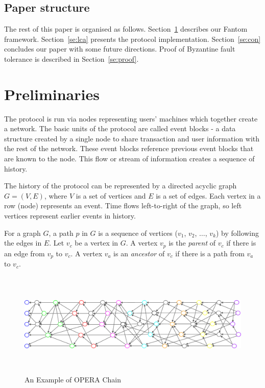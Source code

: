 \documentclass{article}
\begin{document}
\subsection{Paper structure}

The rest of this paper is organised as follows.
Section~\ref{se:prelim} describes our Fantom framework.
Section~\ref{se:lca} presents the protocol implementation.
Section~\ref{se:con} concludes our paper with some future directions.
Proof of Byzantine fault tolerance is described in Section~\ref{se:proof}.


\section{Preliminaries}\label{se:prelim}

The protocol is run via nodes representing users' machines which together create a network. The basic units of the protocol are called event blocks - a data structure created by a single node to share transaction and user information with the rest of the network. These event blocks reference previous event blocks that are known to the node. This flow or stream of information creates a sequence of history.

The history of the protocol can be represented by a directed acyclic graph $G=(V, E)$, where $V$ is a set of vertices and $E$ is a set of edges. Each vertex in a row (node) represents an event. Time flows left-to-right of the graph, so left vertices represent earlier events in history. 

For a graph $G$, a path $p$ in $G$ is a sequence  of vertices ($v_1$, $v_2$, $\dots$, $v_k$) by following the edges in $E$.
Let $v_c$ be a vertex in $G$.
A vertex $v_p$ is the \emph{parent} of $v_c$ if there is an edge from $v_p$ to $v_c$.
A vertex $v_a$ is an \emph{ancestor} of $v_c$ if there is a path from $v_a$ to $v_c$.

\begin{figure}[h] \centering
\includegraphics[height=5cm, width=1.0\columnwidth]{OPERA_chain.pdf}
\caption{An Example of OPERA Chain}
\label{fig:operachain}
\end{figure}
\end{document}

